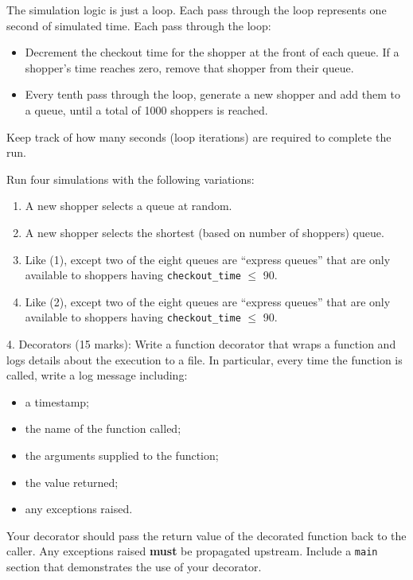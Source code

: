 \documentclass{article}
\begin{document}
The simulation logic is just a loop. Each pass through the loop represents one second of simulated time. Each pass through the loop:
\begin{itemize}
  \item Decrement the checkout time for the shopper at the front of each queue. If a shopper's time reaches zero, remove that shopper from their queue.
  \item Every tenth pass through the loop, generate a new shopper and add them to a queue, until a total of 1000 shoppers is reached.
\end{itemize}
Keep track of how many seconds (loop iterations) are required to complete the run.  

Run four simulations with the following variations:
\begin{enumerate}
  \item A new shopper selects a queue at random.
  \item A new shopper selects the shortest (based on number of shoppers) queue.
  \item Like (1), except two of the eight queues are ``express queues'' that are only available to shoppers having \texttt{checkout\_time} $\leq$ 90.
  \item Like (2), except two of the eight queues are ``express queues'' that are only available to shoppers having \texttt{checkout\_time} $\leq$ 90.
\end{enumerate}

\vspace{3mm}
4. Decorators (15 marks): Write  a function decorator that wraps a function and logs details about the execution to a file. In particular, every time the function is called, write a log message including:
  \begin{itemize}
    \item a timestamp;
    \item the name of the function called;
    \item the arguments supplied to the function;
    \item the value returned;
    \item any exceptions raised.
  \end{itemize}
  
Your decorator should pass the return value of the decorated function back to the caller. Any exceptions raised \textbf{must} be propagated upstream. Include a \texttt{main} section that demonstrates the use of your decorator.
\end{document}
